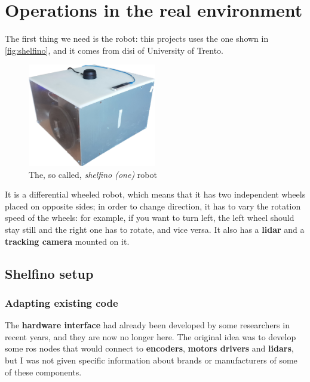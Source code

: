 \chapter{Operations in the real environment}
\label{cha:realworld}

The first thing we need is the robot: this projects uses the one shown in \autoref{fig:shelfino}, and it comes from \acrfull{disi} of University of Trento.

\bigskip

\begin{figure}[h]
  \centering
  \includegraphics[width=0.5\textwidth]{images/shelfino}
  \caption{The, so called, \textit{shelfino (one)} robot}
  \label{fig:shelfino}
\end{figure}

It is a differential wheeled robot, which means that it has two independent wheels placed on opposite sides; in order to change direction, it has to vary the rotation speed of the wheels: for example, if you want to turn left, the left wheel should stay still and the right one has to rotate, and vice versa. It also has a \textbf{lidar} and a \textbf{tracking camera} mounted on it.

\section{Shelfino setup} 

\subsection{Adapting existing code}

The \textbf{hardware interface} had already been developed by some researchers in recent years, and they are now no longer here. The original idea was to develop some \acrshort{ros} nodes that would connect to \textbf{encoders}, \textbf{motors drivers} and \textbf{lidars}, but I was not given specific information about brands or manufacturers of some of these components.

